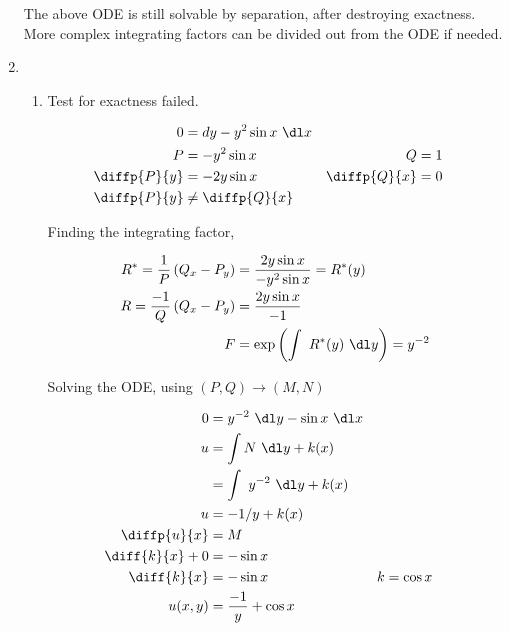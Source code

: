 \begin{enumerate}
          The above ODE is still solvable by separation, after destroying exactness. More complex
          integrating factors can be divided out from the ODE if needed.

    \item
          \begin{enumerate}
              \item Test for exactness failed.

                    \begin{align}
                        0            & = dy - y^{2}\sin x\ \dl x                      \\
                        P            & = -y^{2}\sin x            & Q            & = 1 \\
                        \diffp{P}{y} & = -2y\sin x               & \diffp{Q}{x} & = 0 \\
                        \diffp{P}{y} & \neq \diffp{Q}{x}
                    \end{align}

                    Finding the integrating factor,

                    \begin{align}
                        R^{*} = \frac{1}{P} \left( Q_{x} - P_{y} \right) & = \frac{2y\sin x}{-y^{2}\sin x}    = R^{*}(y)       \\
                        R = \frac{-1}{Q}\left( Q_{x} - P_{y} \right)     & = \frac{2y\sin x}{-1}                               \\
                        F                                                & = \exp \left( \int\ R^{*}(y)\ \dl y\right) = y^{-2}
                    \end{align}

                    Solving the ODE, using $ (P, Q) \rightarrow (M, N) $

                    \begin{align}
                        0               & = y^{-2}\ \dl y- \sin x\ \dl x                \\
                        u               & = \int N\ \dl y+ k(x)                         \\
                                        & = \int\ y^{-2}\ \dl y+ k(x)                   \\
                        u               & = -1/y + k(x)                                 \\
                        \diffp{u}{x}    & = M                                           \\
                        \diff{k}{x} + 0 & = -\sin x                                     \\
                        \diff{k}{x}     & = -\sin x                      & k & = \cos x \\
                        u(x, y)         & = \frac{-1}{y} + \cos x
                    \end{align}



\end{enumerate}
\end{enumerate}
